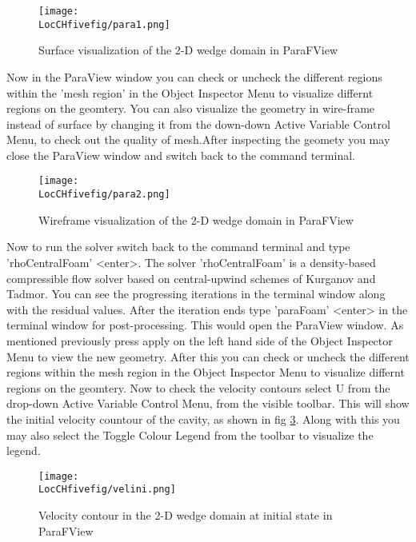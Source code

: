 \begin{figure}[ht]  
\begin{center}  
\texttt{[image: \\LocCHfivefig/para1.png]}
\caption{Surface visualization of the 2-D wedge domain in ParaFView}
\label{para1}
\end{center}  
\end{figure}

\flushleft Now in the ParaView window you can check or uncheck the different regions within the 'mesh region' in  the Object Inspector Menu to visualize differnt regions on the geomtery. You can also visualize the geometry in wire-frame instead of surface by changing it from the down-down Active Variable Control Menu, to check out the quality of mesh.After inspecting the geomety you may close the ParaView window and switch back to the command terminal.

\begin{figure}[ht]  
\begin{center}  
\texttt{[image: \\LocCHfivefig/para2.png]}
\caption{Wireframe visualization of the 2-D wedge domain in ParaFView}
\label{para2}
\end{center}  
\end{figure}

\flushleft Now to run the solver switch back to the command terminal and type 'rhoCentralFoam' <enter>. The solver 'rhoCentralFoam' is a density-based compressible flow solver based on central-upwind schemes of Kurganov and Tadmor. You can see the progressing iterations in the terminal window along with the residual values. After the iteration ends type 'paraFoam' <enter> in the terminal window for post-processing.  
\flushleft This would open the ParaView window. As mentioned previously press apply on the left hand side of the Object Inspector Menu to view the new geometry. After this you can check or uncheck the different regions within the mesh region in  the Object Inspector Menu to visualize differnt regions on the geomtery. Now to check the velocity contours select U from the drop-down Active Variable Control Menu, from the visible toolbar. This will show the initial velocity countour of the cavity, as shown in fig \ref{velini}. Along with this you may also select the Toggle Colour Legend from the toolbar to visualize the legend. 

\begin{figure}[ht]  
\begin{center}  
\texttt{[image: \\LocCHfivefig/velini.png]}
\caption{Velocity contour in the 2-D wedge domain at initial state in ParaFView}
\label{velini}
\end{center}  
\end{figure}

